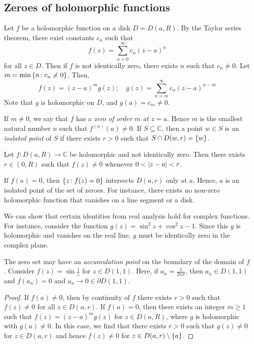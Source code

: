 \subsection{Zeroes of holomorphic functions}
\begin{definition}
	Let \( f \) be a holomorphic function on a disk \( D = D(a,R) \).
	By the Taylor series theorem, there exist constants \( c_n \) such that
	\[ f(z) = \sum_{n=0}^\infty c_n (z-a)^n \]
	for all \( z \in D \).
	Then if \( f \) is not identically zero, there exists \( n \) such that \( c_n \neq 0 \).
	Let \( m = \min \qty{ n \colon c_n \neq 0 } \).
	Then,
	\[ f(z) = (z-a)^m g(z);\quad g(z) = \sum_{n=m}^\infty c_n (z-a)^{n-m} \]
	Note that \( g \) is holomorphic on \( D \), and \( g(a) = c_m \neq 0 \).

	If \( m \neq 0 \), we say that \( f \) has a \textit{zero of order \( m \) at \( z = a \)}.
	Hence \( m \) is the smallest natural number \( n \) such that \( f^{(n)}(a) \neq 0 \).
	If \( S \subseteq \mathbb C \), then a point \( w \in S \) is an \textit{isolated point} of \( S \) if there exists \( r > 0 \) such that \( S \cap D(w,r) = \qty{w} \).
\end{definition}
\begin{theorem}
	Let \( f \colon D(a,R) \to \mathbb C \) be holomorphic and not identically zero.
	Then there exists \( r \in (0,R) \) such that \( f(z) \neq 0 \) whenever \( 0 < \abs{z-a} < r \).
\end{theorem}
\begin{remark}
	If \( f(a) = 0 \), then \( \qty{z \colon f(z) = 0} \) intersects \( D(a,r) \) only at \( a \).
	Hence, \( a \) is an isolated point of the set of zeroes.
	For instance, there exists no non-zero holomorphic function that vanishes on a line segment or a disk.

	We can show that certain identities from real analysis hold for complex functions.
	For instance, consider the function \( g(z) = \sin^2 z + \cos^2 z - 1 \).
	Since this \( g \) is holomorphic and vanishes on the real line, \( g \) must be identically zero in the complex plane.

	The zero set may have an \textit{accumulation point} on the boundary of the domain of \( f \).
	Consider \( f(z) = \sin \frac{1}{z} \) for \( z \in D(1,1) \).
	Here, if \( a_n = \frac{1}{2n \pi} \), then \( a_n \in D(1,1) \) and \( f(a_n) = 0 \) and \( a_n \to 0 \in \partial D(1,1) \).
\end{remark}
\begin{proof}
	If \( f(a) \neq 0 \), then by continuity of \( f \) there exists \( r > 0 \) such that \( f(z) \neq 0 \) for all \( z \in D(a,r) \).
	If \( f(a) = 0 \), then there exists an integer \( m \geq 1 \) such that \( f(z) = (z-a)^m g(z) \) for \( z \in D(a,R) \), where \( g \) is holomorphic with \( g(a) \neq 0 \).
	In this case, we find that there exists \( r > 0 \) such that \( g(z) \neq 0 \) for \( z \in D(a,r) \) and hence \( f(z) \neq 0 \) for \( z \in D(a,r) \setminus \qty{a} \).
\end{proof}

